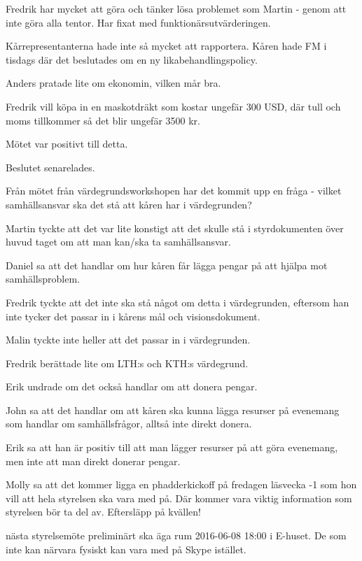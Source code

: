 \documentclass[10pt]{article}
\begin{document}
\begin{paragrafer}
\begin{paragrafer}
Fredrik har mycket att göra och tänker lösa problemet som Martin - genom att inte göra alla tentor. Har fixat med funktionärsutvärderingen.

Kårrepresentanterna hade inte så mycket att rapportera. Kåren hade FM i tisdags där det beslutades om en ny likabehandlingspolicy.

Anders pratade lite om ekonomin, vilken mår bra.

\end{paragrafer}

Fredrik vill köpa in en maskotdräkt som kostar ungefär 300 USD, där tull och moms tillkommer så det blir ungefär 3500 kr.

Mötet var positivt till detta.

Beslutet senarelades.

Från mötet från värdegrundsworkshopen har det kommit upp en fråga - vilket samhällsansvar ska det stå att kåren har i värdegrunden?

Martin tyckte att det var lite konstigt att det skulle stå i styrdokumenten över huvud taget om att man kan/ska ta samhällsansvar.

Daniel sa att det handlar om hur kåren får lägga pengar på att hjälpa mot samhällsproblem.

Fredrik tyckte att det inte ska stå något om detta i värdegrunden, eftersom han inte tycker det passar in i kårens mål och visionsdokument.

Malin tyckte inte heller att det passar in i värdegrunden.

Fredrik berättade lite om LTH:s och KTH:s värdegrund.

Erik undrade om det också handlar om att donera pengar.

John sa att det handlar om att kåren ska kunna lägga resurser på evenemang som handlar om samhällsfrågor, alltså inte direkt donera.

Erik sa att han är positiv till att man lägger resurser på att göra evenemang, men inte att man direkt donerar pengar.

Molly sa att det kommer ligga en phadderkickoff på fredagen läsvecka -1 som hon vill att hela styrelsen ska vara med på. Där kommer vara viktig information som styrelsen bör ta del av. Eftersläpp på kvällen!

\Mba nästa styrelsemöte preliminärt ska äga rum 2016-06-08 18:00 i E-huset. De som inte kan närvara fysiskt kan vara med på Skype istället.


\end{paragrafer}
\end{document}
